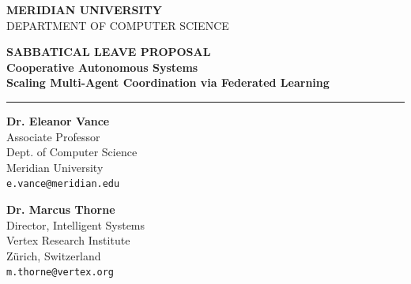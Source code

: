 \thispagestyle{empty}


\vspace{1.5cm}

\begin{center}
    \color{white}
    {\sffamily\bfseries\Large MERIDIAN UNIVERSITY}\\[0.3em]
    {\sffamily\color{lightbg}\small DEPARTMENT OF COMPUTER SCIENCE}
\end{center}

\vspace{2.0cm}

\begin{center}
    {\sffamily\color{darkgray}\bfseries\large SABBATICAL LEAVE PROPOSAL}\\[1.5em]
    {\Huge\bfseries\color{primarycolor} Cooperative Autonomous Systems}\\[0.5em]
    {\Large\bfseries\color{secondarycolor} Scaling Multi-Agent Coordination via Federated Learning}\\[1.5em]
    \rule{8cm}{1.5pt}
\end{center}

\vspace{2.0cm}

\noindent
\begin{minipage}[t]{0.48\textwidth}
    \begin{tcolorbox}[colback=lightbg, colframe=primarycolor, title={\faUser\quad Applicant Info}, fonttitle=\bfseries\sffamily]
        \textbf{Dr. Eleanor Vance}\\
        Associate Professor\\
        Dept. of Computer Science\\
        Meridian University\\
        \texttt{e.vance@meridian.edu}
    \end{tcolorbox}
\end{minipage}\hfill
\begin{minipage}[t]{0.48\textwidth}
    \begin{tcolorbox}[colback=lightbg, colframe=secondarycolor, title={\faBuilding\quad Host Collaborator}, fonttitle=\bfseries\sffamily]
        \textbf{Dr. Marcus Thorne}\\
        Director, Intelligent Systems\\
        Vertex Research Institute\\
        Zürich, Switzerland\\
        \texttt{m.thorne@vertex.org}
    \end{tcolorbox}
\end{minipage}

